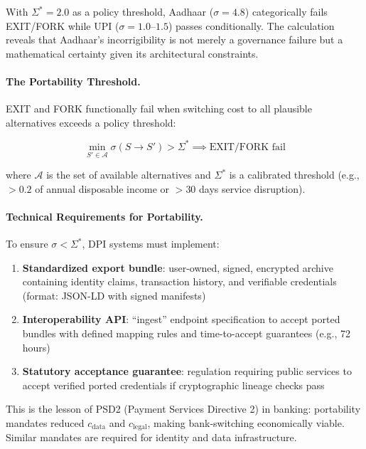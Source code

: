 \documentclass{article}
\begin{document}
With $\Sigma^* = 2.0$ as a policy threshold, Aadhaar ($\sigma = 4.8$) categorically fails EXIT/FORK while UPI ($\sigma = 1.0$--$1.5$) passes conditionally. The calculation reveals that Aadhaar's incorrigibility is not merely a governance failure but a mathematical certainty given its architectural constraints.

\paragraph{The Portability Threshold.} EXIT and FORK functionally fail when switching cost to all plausible alternatives exceeds a policy threshold:

\begin{equation}
\min_{S' \in \mathcal{A}} \sigma(S \to S') > \Sigma^* \implies \text{EXIT/FORK fail}
\label{eq:portability-threshold}
\end{equation}

where $\mathcal{A}$ is the set of available alternatives and $\Sigma^*$ is a calibrated threshold (e.g., $>0.2$ of annual disposable income or $>30$ days service disruption).

\paragraph{Technical Requirements for Portability.} To ensure $\sigma < \Sigma^*$, DPI systems must implement:
\begin{enumerate}[noitemsep]
    \item \textbf{Standardized export bundle}: user-owned, signed, encrypted archive containing identity claims, transaction history, and verifiable credentials (format: JSON-LD with signed manifests)
    \item \textbf{Interoperability API}: ``ingest'' endpoint specification to accept ported bundles with defined mapping rules and time-to-accept guarantees (e.g., 72 hours)
    \item \textbf{Statutory acceptance guarantee}: regulation requiring public services to accept verified ported credentials if cryptographic lineage checks pass
\end{enumerate}

This is the lesson of PSD2 (Payment Services Directive 2) in banking: portability mandates reduced $c_{\text{data}}$ and $c_{\text{legal}}$, making bank-switching economically viable. Similar mandates are required for identity and data infrastructure.
\end{document}
